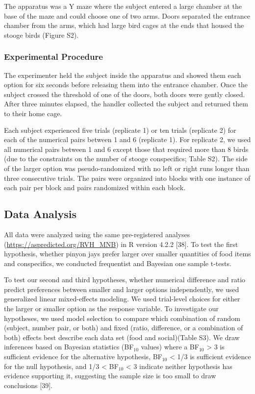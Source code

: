 \documentclass[
  ,doc,floatsintext]{apa6}
\begin{document}
The apparatus was a Y maze where the subject entered a large chamber at the base of the maze and could choose one of two arms. Doors separated the entrance chamber from the arms, which had large bird cages at the ends that housed the stooge birds (Figure S2).

\hypertarget{experimental-procedure-1}{%
\subsubsection{Experimental Procedure}\label{experimental-procedure-1}}

The experimenter held the subject inside the apparatus and showed them each option for six seconds before releasing them into the entrance chamber. Once the subject crossed the threshold of one of the doors, both doors were gently closed. After three minutes elapsed, the handler collected the subject and returned them to their home cage.

Each subject experienced five trials (replicate 1) or ten trials (replicate 2) for each of the numerical pairs between 1 and 6 (replicate 1). For replicate 2, we used all numerical pairs between 1 and 6 except those that required more than 8 birds (due to the constraints on the number of stooge conspecifics; Table S2). The side of the larger option was pseudo-randomized with no left or right runs longer than three consecutive trials. The pairs were organized into blocks with one instance of each pair per block and pairs randomized within each block.

\hypertarget{data-analysis}{%
\subsection{Data Analysis}\label{data-analysis}}

All data were analyzed using the same pre-registered analyses (\url{https://aspredicted.org/RVH_MNB}) in R version 4.2.2 {[}38{]}. To test the first hypothesis, whether pinyon jays prefer larger over smaller quantities of food items and conspecifics, we conducted frequentist and Bayesian one sample t-tests.

To test our second and third hypotheses, whether numerical difference and ratio predict preferences between smaller and larger options independently, we used generalized linear mixed-effects modeling. We used trial-level choices for either the larger or smaller option as the response variable. To investigate our hypotheses, we used model selection to compare which combination of random (subject, number pair, or both) and fixed (ratio, difference, or a combination of both) effects best describe each data set (food and social)(Table S3). We draw inferences based on Bayesian statistics (BF\(_{10}\) values) where a BF\(_{10}\) \textgreater{} 3 is sufficient evidence for the alternative hypothesis, BF\(_{10}\) \textless{} 1/3 is sufficient evidence for the null hypothesis, and 1/3 \textless{} BF\(_{10}\) \textless{} 3 indicate neither hypothesis has evidence supporting it, suggesting the sample size is too small to draw conclusions {[}39{]}.
\end{document}
